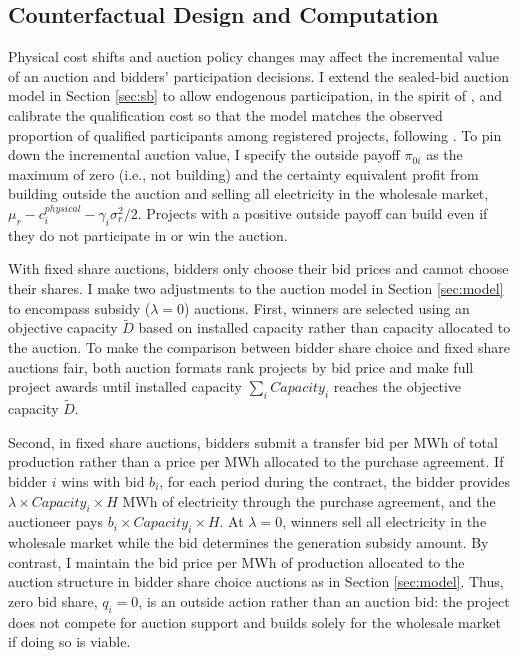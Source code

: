 \documentclass[12pt]{article}
\theoremstyle{definition} %
\begin{document}
\subsection{Counterfactual Design and Computation}

Physical cost shifts and auction policy changes may affect the incremental value of an auction and bidders' participation decisions. I extend the sealed-bid auction model in Section \ref{sec:sb} to allow endogenous participation, in the spirit of \citet{Samuelson1985}, and calibrate the qualification cost so that the model matches the observed proportion of qualified participants among registered projects, following \citet{Bolotnyy2023}. To pin down the incremental auction value, I specify the outside payoff $\pi_{0i}$ as the maximum of zero (i.e., not building) and the certainty equivalent profit from building outside the auction and selling all electricity in the wholesale market, $\mu_r-c_i^{physical}-\gamma_i\sigma_r^2/2$. Projects with a positive outside payoff can build even if they do not participate in or win the auction.

With fixed share auctions, bidders only choose their bid prices and cannot choose their shares. I make two adjustments to the auction model in Section \ref{sec:model} to encompass subsidy ($\lambda=0$) auctions. First, winners are selected using an objective capacity $\widetilde D$ based on installed capacity rather than capacity allocated to the auction. To make the comparison between bidder share choice and fixed share auctions fair, both auction formats rank projects by bid price and make full project awards until installed capacity $\sum_i Capacity_i $ reaches the objective capacity $\widetilde D$.

Second, in fixed share auctions, bidders submit a transfer bid per MWh of total production rather than a price per MWh allocated to the purchase agreement. If bidder $i$ wins with bid $b_i$, for each period during the contract, the bidder provides $\lambda \times Capacity_i \times H$ MWh of electricity through the purchase agreement, and the auctioneer pays $b_i \times Capacity_i \times H$. At $\lambda=0$, winners sell all electricity in the wholesale market while the bid determines the generation subsidy amount. By contrast, I maintain the bid price per MWh of production allocated to the auction structure in bidder share choice auctions as in Section \ref{sec:model}. Thus, zero bid share, $q_i=0$, is an outside action rather than an auction bid: the project does not compete for auction support and builds solely for the wholesale market if doing so is viable.
\end{document}
